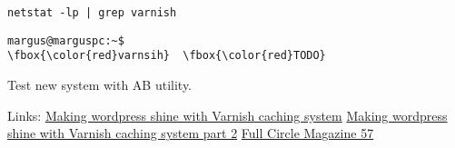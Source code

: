 \begin{verbatim}
netstat -lp | grep varnish
\end{verbatim}


\begin{Verbatim}[frame=single,
label=Command output,framesep=2mm,rulecolor=\color{red},commandchars=\\\{\}]
margus@marguspc:~$ 
\fbox{\color{red}varnsih}  \fbox{\color{red}TODO}
\end{Verbatim}


Test new system with AB utility.

Links:
\href{http://kaanon.com/blog/work/making-wordpress-shine-varnish-caching-system-part-1}{Making wordpress shine with Varnish caching system}
\href{http://kaanon.com/blog/varnish/making-wordpress-shine-varnish-caching-system-part-2}{Making wordpress shine with Varnish caching system part 2}
\href{http://www.google.com/producer/editions/CAowvZtX/full_circle_magazine_57_lite}
{Full Circle Magazine 57}

